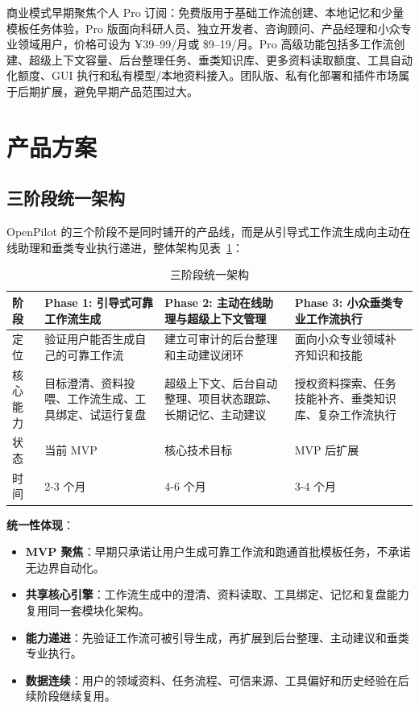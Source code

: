 \documentclass[12pt,a4paper]{ctexart}
\begin{document}
商业模式早期聚焦个人 Pro 订阅：免费版用于基础工作流创建、本地记忆和少量模板任务体验，Pro 版面向科研人员、独立开发者、咨询顾问、产品经理和小众专业领域用户，价格可设为 ¥39--99/月或 \$9--19/月。Pro 高级功能包括多工作流创建、超级上下文容量、后台整理任务、垂类知识库、更多资料读取额度、工具自动化额度、GUI 执行和私有模型/本地资料接入。团队版、私有化部署和插件市场属于后期扩展，避免早期产品范围过大。

\section{产品方案}

\subsection{三阶段统一架构}

OpenPilot 的三个阶段不是同时铺开的产品线，而是从引导式工作流生成向主动在线助理和垂类专业执行递进，整体架构见表~\ref{tab:three-phases}：

\begin{table}[htbp]
  \centering
  \small
  \begin{tabularx}{\textwidth}{p{2.5cm} X X X}
    \toprule
    \textbf{阶段} & \textbf{Phase 1: 引导式可靠工作流生成} & \textbf{Phase 2: 主动在线助理与超级上下文管理} & \textbf{Phase 3: 小众垂类专业工作流执行} \\
    \midrule
    定位 & 验证用户能否生成自己的可靠工作流 & 建立可审计的后台整理和主动建议闭环 & 面向小众专业领域补齐知识和技能 \\
    核心能力 & 目标澄清、资料投喂、工作流生成、工具绑定、试运行复盘 & 超级上下文、后台自动整理、项目状态跟踪、长期记忆、主动建议 & 授权资料探索、任务技能补齐、垂类知识库、复杂工作流执行 \\
    状态 & 当前 MVP & 核心技术目标 & MVP 后扩展 \\
    时间 & 2-3 个月 & 4-6 个月 & 3-4 个月 \\
    \bottomrule
  \end{tabularx}
  \caption{三阶段统一架构}
  \label{tab:three-phases}
\end{table}

\textbf{统一性体现}：
\begin{itemize}
  \item \textbf{MVP 聚焦}：早期只承诺让用户生成可靠工作流和跑通首批模板任务，不承诺无边界自动化。
  \item \textbf{共享核心引擎}：工作流生成中的澄清、资料读取、工具绑定、记忆和复盘能力复用同一套模块化架构。
  \item \textbf{能力递进}：先验证工作流可被引导生成，再扩展到后台整理、主动建议和垂类专业执行。
  \item \textbf{数据连续}：用户的领域资料、任务流程、可信来源、工具偏好和历史经验在后续阶段继续复用。
\end{itemize}
\end{document}
